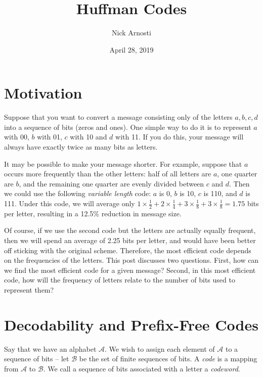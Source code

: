 \documentclass[11pt, oneside]{article}   	%
\title{\vspace{-.3 in} Huffman Codes}
\author{Nick Arnosti}
\date{April 28, 2019}							%
\begin{document}
\maketitle


\section{Motivation}

Suppose that you want to convert a message consisting only of the letters $a, b, c, d$ into a sequence of bits (zeros and ones). One simple way to do it is to represent $a$ with 00, $b$ with 01, $c$ with 10 and $d$ with 11. If you do this, your message will always have exactly twice as many bits as letters. 

It may be possible to make your message shorter. For example, suppose that $a$ occurs more frequently than the other letters: half of all letters are $a$, one quarter are $b$, and the remaining one quarter are evenly divided between $c$ and $d$. Then we could use the following {\em variable length} code: $a$ is 0, $b$ is 10, $c$ is 110, and $d$ is 111. Under this code, we will average only  $1 \times \frac{1}{2} + 2 \times \frac{1}{4} + 3 \times \frac{1}{8} + 3 \times \frac{1}{8} = 1.75$ bits per letter, resulting in a 12.5\% reduction in message size.

Of course, if we use the second code but the letters are actually equally frequent, then we will spend an average of 2.25 bits per letter, and would have been better off sticking with the original scheme. Therefore, the most efficient code depends on the frequencies of the letters. This post discusses two questions. First, how can we find the most efficient code for a given message? Second, in this most efficient code, how will the frequency of letters relate to the number of bits used to represent them?


\section{Decodability and Prefix-Free Codes}

Say that we have an alphabet $\mathcal{A}$. We wish to assign each element of $\mathcal{A}$ to a sequence of bits -- let $\mathcal{B}$ be the set of finite sequences of bits. A {\em code} is a mapping from $\mathcal{A}$ to $\mathcal{B}$. We call a sequence of bits associated with a letter a {\em codeword}.
\end{document}
